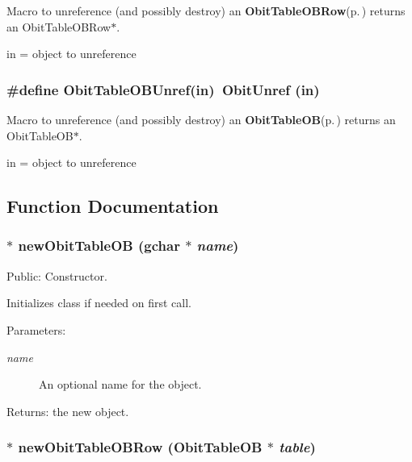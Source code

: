 Macro to unreference (and possibly destroy) an {\bf Obit\-Table\-OBRow}{\rm (p.\,\pageref{structObitTableOBRow})} returns an Obit\-Table\-OBRow$\ast$. 

in = object to unreference 
\subsubsection{\setlength{\rightskip}{0pt plus 5cm}\#define Obit\-Table\-OBUnref(in)\ Obit\-Unref (in)}\label{ObitTableOB_8h_a1}


Macro to unreference (and possibly destroy) an {\bf Obit\-Table\-OB}{\rm (p.\,\pageref{structObitTableOB})} returns an Obit\-Table\-OB$\ast$. 

in = object to unreference 

\subsection{Function Documentation}
\subsubsection{$\ast$ new\-Obit\-Table\-OB (gchar $\ast$ {\em name})}\label{ObitTableOB_8h_a11}


Public: Constructor. 

Initializes class if needed on first call. \begin{Desc}
\item[Parameters:]
\begin{description}
\item[{\em name}]An optional name for the object. \end{description}
\end{Desc}
\begin{Desc}
\item[Returns:]the new object. \end{Desc}
\subsubsection{$\ast$ new\-Obit\-Table\-OBRow ({\bf Obit\-Table\-OB} $\ast$ {\em table})}\label{ObitTableOB_8h_a8}


